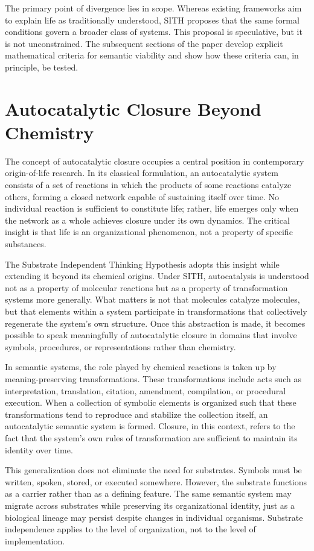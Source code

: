 \documentclass[11pt,oneside]{article}
\begin{document}
The primary point of divergence lies in scope. Whereas existing frameworks aim to explain life as traditionally understood, SITH proposes that the same formal conditions govern a broader class of systems. This proposal is speculative, but it is not unconstrained. The subsequent sections of the paper develop explicit mathematical criteria for semantic viability and show how these criteria can, in principle, be tested.


\section{Autocatalytic Closure Beyond Chemistry} 

The concept of autocatalytic closure occupies a central position in contemporary origin-of-life research. In its classical formulation, an autocatalytic system consists of a set of reactions in which the products of some reactions catalyze others, forming a closed network capable of sustaining itself over time. No individual reaction is sufficient to constitute life; rather, life emerges only when the network as a whole achieves closure under its own dynamics. The critical insight is that life is an organizational phenomenon, not a property of specific substances.

The Substrate Independent Thinking Hypothesis adopts this insight while extending it beyond its chemical origins. Under SITH, autocatalysis is understood not as a property of molecular reactions but as a property of transformation systems more generally. What matters is not that molecules catalyze molecules, but that elements within a system participate in transformations that collectively regenerate the system’s own structure. Once this abstraction is made, it becomes possible to speak meaningfully of autocatalytic closure in domains that involve symbols, procedures, or representations rather than chemistry.

In semantic systems, the role played by chemical reactions is taken up by meaning-preserving transformations. These transformations include acts such as interpretation, translation, citation, amendment, compilation, or procedural execution. When a collection of symbolic elements is organized such that these transformations tend to reproduce and stabilize the collection itself, an autocatalytic semantic system is formed. Closure, in this context, refers to the fact that the system’s own rules of transformation are sufficient to maintain its identity over time.

This generalization does not eliminate the need for substrates. Symbols must be written, spoken, stored, or executed somewhere. However, the substrate functions as a carrier rather than as a defining feature. The same semantic system may migrate across substrates while preserving its organizational identity, just as a biological lineage may persist despite changes in individual organisms. Substrate independence applies to the level of organization, not to the level of implementation.
\end{document}
